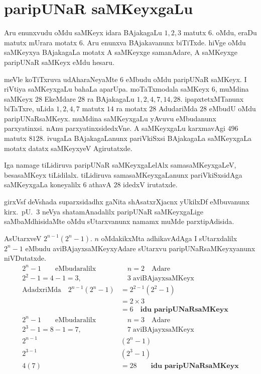 \chapter{paripUNaR saMKeyxgaLu}

\vskip -20pt
Aru enunxvudu oMdu saMKeyx idara BAjakagaLu $1,2,3$ matutx $6$. oMdu, eraDu matutx mUrara motatx $6$. 
Aru enunxva BAjakavanunx biTiTxde. hiVge oMdu saMKeyxya BAjakagaLa motatx A saMKeyxge samanAdare, A saMKeyxge paripUNaR saMKeyx eMdu hesaru.

meVle koTiTxruva  udAharaNeyaMte $6$ eMbudu oMdu paripUNaR saMKeyx. I riVtiya saMKeyxgaLu bahaLa aparUpa.  moTaTxmodala saMKeyx $6$, muMdina saMKeyx $28$ EkeMdare $28$ ra BAjakagaLu $1,2,4,7,14,28$. ipapxtetxMTanunx biTaTxre, uLida $1,2,4,7$ matutx $14$ ra motatx $28$ AdudariMda $28$ eMbudU oMdu paripUNaRsaMKeyx. muMdina saMKeyxgaLu yAvuvu eMbudanunx parxyatinxsi. nAnu parxyatinxsidedxVne. A saMKeyxgaLu karxmavAgi $496$ matutx $8128$. ivugaLa BAjakagaLanunx pariVkiSxsi BAjakagaLa saMKeyxgaLa motatx datatx saMKeyxyeV Agirutatxde.  

Iga namage tiLidiruva paripUNaR saMKeyxgaLelAlx samasaMKeyxgaLeV, besasaMKeyx tiLidilalx. tiLidiruva samasaMKeyxgaLanunx pariVkiSxsidAga saMKeyxgaLa koneyalilx $6$ athavA $28$ idedxV irutatxde.

girxVsf deVshada suparxsidadhx gaNita shAsatxrXjacnx yUkilxDf eMbuvanunx kirx.~pU.\ $3$ neVya shatamAnadalilx paripUNaR saMKeyxgaLige saMbaMdhisidaMte oMdu sUtarxvanunx namamx muMde parxtipAdisida.

AsUtarxveV $2^{n-1}(2^{n}-1)$. $n$ oMdakikxMta adhikavAdAga I sUtarxdalilx $2^{n}-1$ eMbudu aviBAjayxsaMKeyxyAdare sUtarxvu paripUNaRsaMKeyxyanunx niVDutatxde. 
\begin{align*}
2^{n}-1 \qquad\text{eMbudaralilx}&  \quad n=2 \quad\text{Adare}\\
2^{2}-1 = 4-1 =3, &\quad 3\;\text{aviBAjayxsaMKeyx}\\
\text{AdadxriMda}\quad 2^{n-1}(2^{n}-1) &= 2^{2-1}(2^{2}-1)\\
&=2\times 3\\
&=6 \quad \textbf{idu paripUNaRsaMKeyx}\\[0.1cm]%
2^{n}-1 \qquad\text{eMbudaralilx} &\quad n=3 \quad\text{Adare}\\
2^{3}-1 = 8-1 = 7, &\quad 7\; \text{aviBAjayxsaMKeyx}\\
2^{n-1}&(2^{n}-1)\\
2^{3-1}&(2^{3}-1)\\
4(7) &= 28 \qquad\textbf{idu paripUNaRsaMKeyx}
\end{align*}

